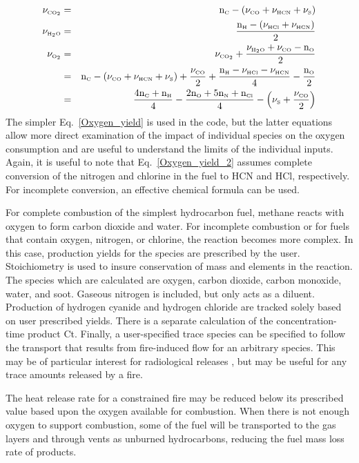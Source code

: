 \begin{eqnarray}
  \nu_{\tiny \hbox{CO}_2} &=& \mathrm{n_{\tiny \hbox{C}}} - { \left( {\nu_{\tiny \hbox{CO}} + \nu_{\tiny \hbox{HCN}} + \nu_{\tiny \hbox{S}}} \right) } \\
  \nu_{\tiny \hbox{H}_2\hbox{O}} &=& \frac{\mathrm{n_{\tiny \hbox{H}}} - { \left( {\nu_{\tiny \hbox{HCl}} + \nu_{\tiny \hbox{HCN}}} \right) }}{2} \\
 \nu_{\tiny \hbox{O}_2} &=& \nu_{\tiny \hbox{CO}_2} + \frac{\nu_{\tiny \hbox{H}_2\hbox{O}} + \nu_{\tiny \hbox{CO}} - \mathrm{n_{\tiny \hbox{O}}}}{2} \label{Oxygen_yield} \\
 &=& \mathrm{n_{\tiny \hbox{C}}} - { \left( {\nu_{\tiny \hbox{CO}} + \nu_{\tiny \hbox{HCN}} + \nu_{\tiny \hbox{S}}} \right) }+\frac{\nu_{\tiny \hbox{CO}}}{2}+\frac{\mathrm{n_{\tiny \hbox{H}}} - \nu_{\tiny \hbox{HCl}} - \nu_{\tiny \hbox{HCN}}}{4}-\frac{\mathrm{n_{\tiny \hbox{O}}}}{2} \\
 &=& \frac{4 \mathrm{n_{\tiny \hbox{C}}+n_{\tiny \hbox{H}}}}{4}-\frac{\mathrm{2 n_{\tiny \hbox{O}}+5 n_{\tiny \hbox{N}}+n_{\tiny \hbox{Cl}}}}{4}-{ \left( {\nu_{\tiny \hbox{S}}+\frac{\nu_{\tiny \hbox{CO}}}{2}} \right) } \label{Oxygen_yield_2}
\end{eqnarray}
The simpler Eq.~\ref{Oxygen_yield} is used in the code, but the latter equations allow more direct examination of the impact of individual species on the oxygen consumption and are useful to understand the limits of the individual inputs. Again, it is useful to note that Eq.~\ref{Oxygen_yield_2} assumes complete conversion of the nitrogen and chlorine in the fuel to HCN and HCl, respectively. For incomplete conversion, an effective chemical formula can be used.

For complete combustion of the simplest hydrocarbon fuel, methane reacts with oxygen to form carbon dioxide and water. For incomplete combustion or for fuels that contain oxygen, nitrogen, or chlorine, the reaction becomes more complex. In this case, production yields for the species are prescribed by the user. Stoichiometry is used to insure conservation of mass and elements in the reaction. The species which are calculated are oxygen, carbon dioxide, carbon monoxide, water, and soot. Gaseous nitrogen is included, but only acts as a diluent. Production of hydrogen cyanide and hydrogen chloride are tracked solely based on user prescribed yields. There is a separate calculation of the concentration-time product Ct. Finally, a user-specified trace species can be specified to follow the transport that results from fire-induced flow for an arbitrary species. This may be of particular interest for radiological releases \cite{Jones:2008}, but may be useful for any trace amounts released by a fire.

The heat release rate for a constrained fire may be reduced below its prescribed value based upon the oxygen available for combustion.  When there is not enough oxygen to support combustion, some of the fuel will be transported to the gas layers and through vents as unburned hydrocarbons, reducing the fuel mass loss rate of products.

